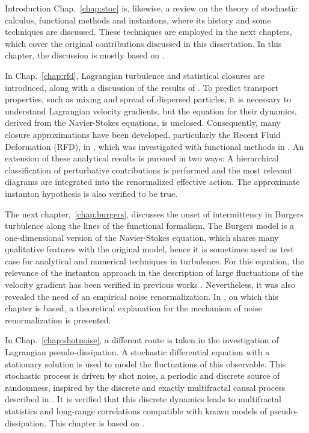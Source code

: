 \begin{chapter}{Introduction}
Chap.~\ref{chap:stoc} is, likewise, a review on the theory of stochastic calculus, functional methods and instantons, where its history and some techniques are discussed. These techniques are employed in the next chapters, which cover the original contributions discussed in this dissertation. In this chapter, the discussion is mostly based on \textcite{gardiner2009,grafke2015instanton,canet2019leshouches}.

In Chap.~\ref{chap:rfd}, Lagrangian turbulence and statistical closures are introduced, along with a discussion of the results of \textcite{apolinario2019instantons}. To predict transport properties, such as mixing and spread of dispersed particles, it is necessary to understand Lagrangian velocity gradients, but the equation for their dynamics, derived from the Navier-Stokes equations, is unclosed. Consequently, many closure approximations have been developed, particularly the Recent Fluid Deformation (RFD), in \textcite{ChevPRL}, which was investigated with functional methods in \textcite{moriconi2014}.
An extension of these analytical results is pursued in two ways: A hierarchical classification of perturbative contributions is performed and the most relevant diagrams are integrated into the renormalized effective action. The approximate instanton hypothesis is also verified to be true.

The next chapter,~\ref{chap:burgers}, discusses the onset
of intermittency in Burgers turbulence along the lines of the functional formalism. The Burgers model is a one-dimensional version of the Navier-Stokes equation, which shares many qualitative features with the original model, hence it is sometimes used as test case for analytical and numerical techniques in turbulence. For this equation, the relevance of the instanton approach in the description of large fluctuations of the velocity gradient has been verified in previous works \parencite{grafke2015relevance}. Nevertheless, it was also revealed the need of an empirical noise renormalization. In \textcite{apolinario2019onset}, on which this chapter is based, a theoretical explanation for the mechanism of noise renormalization is presented.

In Chap.~\ref{chap:shotnoise}, a different route is taken in the investigation of Lagrangian pseudo-dissipation. A stochastic differential equation with a stationary solution is used to model the fluctuations of this observable. This stochastic process is driven by shot noise, a periodic and discrete source of randomness, inspired by the discrete and exactly multifractal causal process described in \textcite{perpete2011}. It is verified that this discrete dynamics leads to multifractal statistics and long-range correlations compatible with known models of pseudo-dissipation. This chapter is based on 
\textcite{apolinario2020shotnoise}.

\end{chapter}
